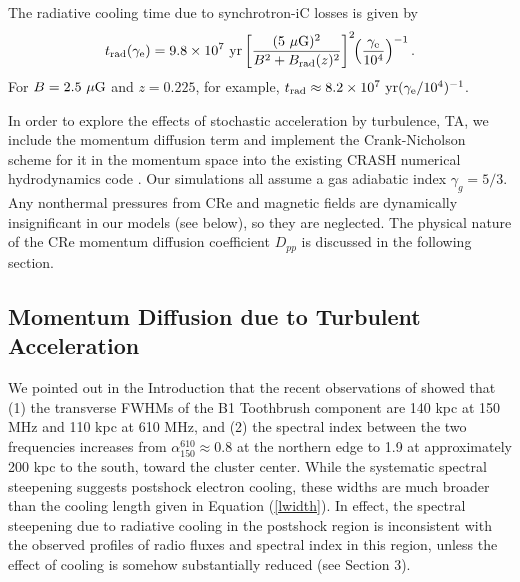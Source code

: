 \documentclass[twocolumn]{aastex61}
\def\yr{~{\rm yr}}
\def\muG{~{\mu\rm G}}
\begin{document}
The radiative cooling time due to synchrotron-iC losses is given by
\begin{equation}
t_{\rm rad} (\gamma_{\rm e}) = 9.8\times 10^{7} \yr
\left[ {(5\muG)^2} \over {B^2+B_{\rm rad}(z)^2} \right]^{2}
 \hskip-3pt\left({\gamma_{\rm e} \over 10^4 }\right)^{-1}.
\label{trad}
\end{equation}
For $B=2.5\muG$ and $z=0.225$, for example, $t_{\rm rad}\approx 8.2\times 10^7 \yr (\gamma_{\rm e}/10^4)^{-1}$.

In order to explore the effects of stochastic acceleration by turbulence, TA, we include the momentum diffusion term and implement the Crank-Nicholson scheme for it in the momentum space into the existing
CRASH numerical hydrodynamics code \citep{kj06}.
Our simulations all assume a gas adiabatic index $\gamma_g = 5/3$. 
Any nonthermal pressures from CRe and magnetic fields are dynamically insignificant in our models (see below), so they are neglected.
The physical nature of the CRe momentum diffusion coefficient $D_{pp}$ is discussed in the following section.

\subsection{Momentum Diffusion due to Turbulent Acceleration}

We pointed out in the Introduction that the recent observations of \citet{vanweeren16} showed that (1) the transverse
FWHMs of the B1 Toothbrush component are 140 kpc at 150 MHz and 110 kpc at 610 MHz, and
(2) the spectral index between the two frequencies increases from $\alpha_{150}^{610}\approx 0.8$ at the northern edge to 1.9 
at approximately 200 kpc to the south, toward the cluster center.
While the systematic spectral steepening suggests postshock electron cooling, these widths are much broader than the cooling length 
given in Equation (\ref{lwidth}). 
In effect, the spectral steepening due to radiative cooling in the postshock region is inconsistent with 
the observed profiles of radio fluxes and spectral index in this region, unless the effect of cooling is somehow substantially reduced 
(see Section 3).
\end{document}
